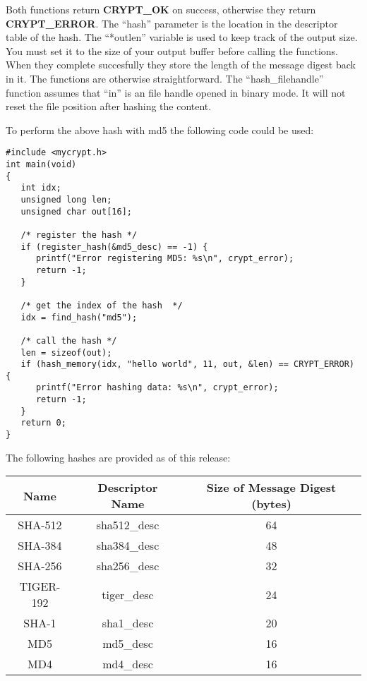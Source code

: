 \documentclass{book}
\begin{document}
Both functions return {\bf CRYPT\_OK} on success, otherwise they return {\bf CRYPT\_ERROR}.  The ``hash'' parameter is
the location in the descriptor table of the hash.  The ``*outlen'' variable is used to keep track of the output size.  You
must set it to the size of your output buffer before calling the functions.  When they complete succesfully they store
the length of the message digest back in it.  The functions are otherwise straightforward.  The ``hash\_filehandle'' function
assumes that ``in'' is an file handle opened in binary mode.  It will not reset the file position after hashing the content.

To perform the above 
hash with md5 the following code could be used:
\begin{small}
\begin{verbatim}
#include <mycrypt.h>
int main(void)
{
   int idx;
   unsigned long len;
   unsigned char out[16];

   /* register the hash */
   if (register_hash(&md5_desc) == -1) {
      printf("Error registering MD5: %s\n", crypt_error);
      return -1;
   }

   /* get the index of the hash  */
   idx = find_hash("md5");

   /* call the hash */
   len = sizeof(out);
   if (hash_memory(idx, "hello world", 11, out, &len) == CRYPT_ERROR) {
      printf("Error hashing data: %s\n", crypt_error);
      return -1;
   }
   return 0;
}
\end{verbatim}
\end{small}

The following hashes are provided as of this release:
\begin{center}
\begin{tabular}{|c|c|c|}
      \hline Name & Descriptor Name & Size of Message Digest (bytes) \\
      \hline SHA-512 & sha512\_desc & 64 \\
      \hline SHA-384 & sha384\_desc & 48 \\
      \hline SHA-256 & sha256\_desc & 32 \\
      \hline TIGER-192 & tiger\_desc & 24 \\
      \hline SHA-1 & sha1\_desc & 20 \\
      \hline MD5 & md5\_desc & 16 \\
      \hline MD4 & md4\_desc & 16 \\
      \hline
\end{tabular}
\end{center}
\end{document}
